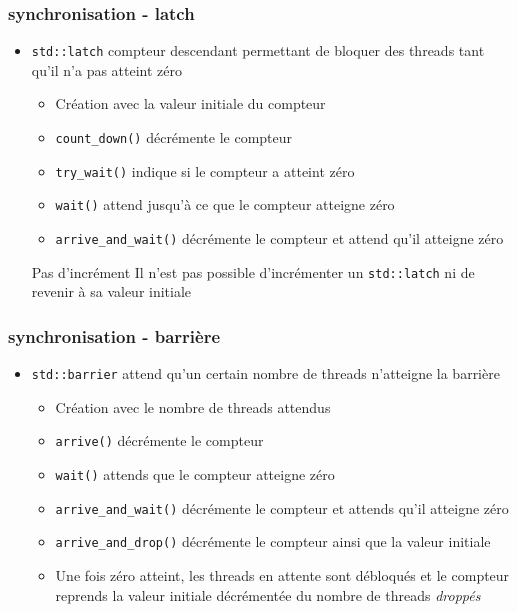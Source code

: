\documentclass[C++.tex]{subfiles}
\begin{document}
\begin{frame}[fragile]
	\frametitle{synchronisation - latch}


	\begin{itemize}
		\item \lstinline|std::latch| compteur descendant permettant de bloquer des threads tant qu'il n'a pas atteint zéro 
		\begin{itemize}
			\item Création avec la valeur initiale du compteur
			\item \lstinline|count_down()| décrémente le compteur
			\item \lstinline|try_wait()| indique si le compteur a atteint zéro
			\item \lstinline|wait()| attend jusqu'à ce que le compteur atteigne zéro
			\item \lstinline|arrive_and_wait()| décrémente le compteur et attend qu'il atteigne zéro
		\end{itemize}

		\begin{alertblock}{Pas d'incrément}
			Il n'est pas possible d'incrémenter un \lstinline|std::latch| ni de revenir à sa valeur initiale
		\end{alertblock}
	\end{itemize}
\end{frame}

\begin{frame}[fragile]
	\frametitle{synchronisation - barrière}
	\begin{itemize}
		\item \lstinline|std::barrier| attend qu'un certain nombre de threads n'atteigne la barrière
		\begin{itemize}
			\item Création avec le nombre de threads attendus
			\item \lstinline|arrive()| décrémente le compteur
			\item \lstinline|wait()| attends que le compteur atteigne zéro
			\item \lstinline|arrive_and_wait()| décrémente le compteur et attends qu'il atteigne zéro
			\item \lstinline|arrive_and_drop()| décrémente le compteur ainsi que la valeur initiale
			\item Une fois zéro atteint, les threads en attente sont débloqués et le compteur reprends la valeur initiale décrémentée du nombre de threads \og \textit{droppés}\fg{}
		\end{itemize}
	\end{itemize}
\end{frame}
\end{document}
